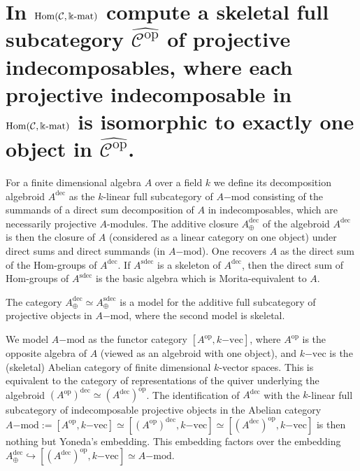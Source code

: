 

\section{In $\mathrm{Hom}(\mathcal{C},\Bbbk\textnormal{-}\mathrm{mat})$ compute a skeletal full subcategory
$\widehat{\mathcal{C}^{\mathrm{op}}}$ of projective indecomposables,
where each projective indecomposable in $\mathrm{Hom}(\mathcal{C},\Bbbk\textnormal{-}\mathrm{mat})$ is isomorphic to exactly one
object in $\widehat{\mathcal{C}^{\mathrm{op}}}$.}



For a finite dimensional algebra $A$ over a field $k$ we define its decomposition algebroid $A^\mathrm{dec}$ as the $k$-linear full subcategory of $A\mathrm{-mod}$ consisting of the summands of a direct sum decomposition of $A$ in indecomposables, which are necessarily projective $A$-modules. The additive closure $A^\mathrm{dec}_\oplus$ of the algebroid $A^\mathrm{dec}$ is then the closure of $A$ (considered as a linear category on one object) under direct sums and direct summands (in $A\mathrm{-mod}$). One recovers $A$ as the direct sum of the $\mathrm{Hom}$-groups of $A^\mathrm{dec}$. If $A^\mathrm{sdec}$ is a skeleton of $A^\mathrm{dec}$, then the direct sum of $\mathrm{Hom}$-groups of $A^\mathrm{sdec}$ is the basic algebra which is Morita-equivalent to $A$.

The category $A^\mathrm{dec}_\oplus \simeq A^\mathrm{sdec}_\oplus$ is a model for the additive full subcategory of projective objects in $A\mathrm{-mod}$, where the second model is skeletal.

We model $A\mathrm{-mod}$ as the functor category $[A^\mathrm{op}, k\mathrm{-vec}]$, where $A^\mathrm{op}$ is the opposite algebra of $A$ (viewed as an algebroid with one object), and $k\mathrm{-vec}$ is the (skeletal) Abelian category of finite dimensional $k$-vector spaces. This is equivalent to the category of representations of the quiver underlying the algebroid $(A^\mathrm{op})^\mathrm{dec} \simeq (A^\mathrm{dec})^\mathrm{op}$. The identification of $A^\mathrm{dec}$ with the $k$-linear full subcategory of indecomposable projective objects in the Abelian category $A\mathrm{-mod} := [A^\mathrm{op}, k\mathrm{-vec}] \simeq [(A^\mathrm{op})^\mathrm{dec}, k\mathrm{-vec}] \simeq [(A^\mathrm{dec})^\mathrm{op}, k\mathrm{-vec}]$ is then nothing but Yoneda's embedding. This embedding factors over the embedding $A^\mathrm{dec}_\oplus \hookrightarrow [(A^\mathrm{dec})^\mathrm{op}, k\mathrm{-vec}] \simeq A\mathrm{-mod}$.


